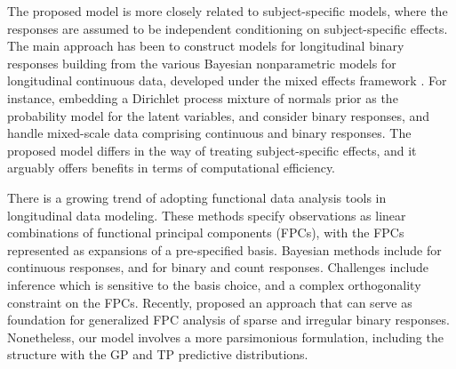 The proposed model is more closely related to subject-specific models, where the 
responses are assumed to be independent conditioning on subject-specific effects. 
The main approach has been to construct models for longitudinal binary responses
building from the various Bayesian nonparametric models for longitudinal continuous data, 
developed under the mixed effects framework \citep[e.g.,][]{LiLinMuller2010,Ghosh2010,Quintana2016}.
For instance, embedding a Dirichlet process mixture of normals prior as the probability model 
for the latent variables, \citet{Jara2007} and \citet{TangDuan2012} consider binary responses,
and \citet{Kunihama2019} handle mixed-scale data comprising continuous and binary responses. 
The proposed model differs in the way of treating subject-specific effects, and it arguably 
offers benefits in terms of computational efficiency. 


There is a growing trend of adopting functional data analysis tools in longitudinal data 
modeling. These methods specify observations as linear combinations of functional principal 
components (FPCs), with the FPCs represented as expansions of a pre-specified basis. 
Bayesian methods include \citet{Jiang2020} for continuous responses, and 
\citet{vanDerLinde2009} for binary and count responses. Challenges include inference 
which is sensitive to the basis choice, and a complex orthogonality constraint on the FPCs.
Recently, \citet{JamseAmy2022} proposed 
an approach that can serve as foundation for generalized FPC analysis of sparse and irregular 
binary responses. Nonetheless, our model involves a more parsimonious formulation, 
including the structure with the GP and TP predictive distributions. 


